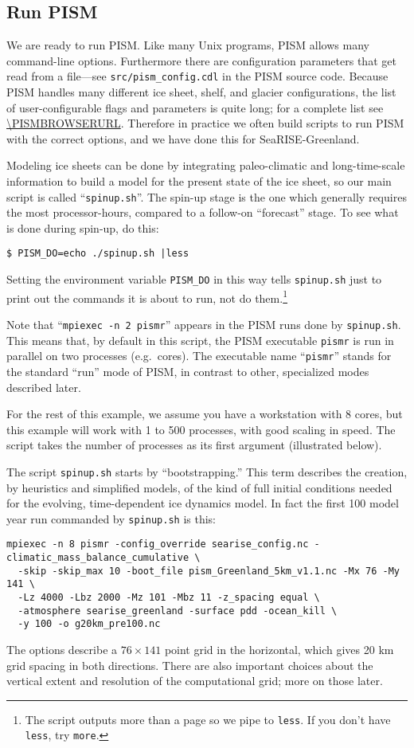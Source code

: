 \subsection{Run PISM}   \label{subsect:runscript}  We are ready to run PISM.  Like many Unix programs, PISM allows many command-line options.  Furthermore there are configuration parameters that get read from a file---see \mbox{\texttt{src/pism_config.cdl}} in the PISM source code.  Because PISM handles many different ice sheet, shelf, and glacier configurations, the list of user-configurable flags and parameters is quite long; for a complete list see \url{\PISMBROWSERURL}.  Therefore in practice we often build scripts to run PISM with the correct options, and we have done this for \mbox{SeaRISE-Greenland}.

Modeling ice sheets can be done by integrating paleo-climatic and long-time-scale information to build a model for the present state of the ice sheet, so our main script is called ``\texttt{spinup.sh}''.  The spin-up stage is the one which generally requires the most processor-hours, compared to a follow-on ``forecast'' stage.  To see what is done during spin-up, do this:
\begin{verbatim}
$ PISM_DO=echo ./spinup.sh |less
\end{verbatim}
Setting the environment variable \texttt{PISM_DO} in this way tells \texttt{spinup.sh} just to print out the commands it is about to run, not do them.\footnote{The script outputs more than a page so we pipe to \texttt{less}.  If you don't have \texttt{less}, try \texttt{more}.}

Note that ``\texttt{mpiexec -n 2 pismr}'' appears in the PISM runs done by \texttt{spinup.sh}.  This means that, by default in this script, the PISM executable \texttt{pismr} is run in parallel on two processes (e.g.~cores).  The executable name ``\texttt{pismr}'' stands for the standard ``run'' mode of PISM, in contrast to other, specialized modes described later.

For the rest of this example, we assume you have a workstation with 8 cores, but this example will work with 1 to 500 processes, with good scaling in speed.  The script takes the number of processes as its first argument (illustrated below).

The script \texttt{spinup.sh} starts by ``bootstrapping.''  This term describes the creation, by heuristics and simplified models, of the kind of full initial conditions needed for the evolving, time-dependent ice dynamics model.  In fact the first 100 model year run commanded by \texttt{spinup.sh} is this:
\small
\begin{verbatim}
mpiexec -n 8 pismr -config_override searise_config.nc -climatic_mass_balance_cumulative \
  -skip -skip_max 10 -boot_file pism_Greenland_5km_v1.1.nc -Mx 76 -My 141 \
  -Lz 4000 -Lbz 2000 -Mz 101 -Mbz 11 -z_spacing equal \
  -atmosphere searise_greenland -surface pdd -ocean_kill \
  -y 100 -o g20km_pre100.nc
\end{verbatim}
\normalsize
The options describe a $76\times 141$ point grid in the horizontal, which gives 20 km grid spacing in both directions.  There are also important choices about the vertical extent and resolution of the computational grid; more on those later. 

